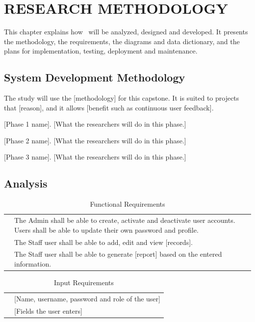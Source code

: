 \chapter{RESEARCH METHODOLOGY}
This chapter explains how \SystemName\ will be analyzed, designed and developed. It presents the methodology, the requirements, the diagrams and data dictionary, and the plans for implementation, testing, deployment and maintenance.

\section{System Development Methodology}
The study will use the [methodology] for this capstone. It is suited to projects that [reason], and it allows [benefit such as continuous user feedback].


[Phase 1 name]. [What the researchers will do in this phase.]

[Phase 2 name]. [What the researchers will do in this phase.]

[Phase 3 name]. [What the researchers will do in this phase.]

\section{Analysis}

\begin{table}[H]\caption{Functional Requirements}\centering
\begin{tabularx}{\textwidth}{|>{\raggedright\arraybackslash}p{1.75in}|Y|}\hline
{} & \\  & The Admin shall be able to create, activate and deactivate user accounts. Users shall be able to update their own password and profile.\\  & The Staff user shall be able to add, edit and view [records].\\ \hline
[Module 3] & The Staff user shall be able to generate [report] based on the entered information.\\ \hline
\end{tabularx}\end{table}

\begin{table}[H]\caption{Input Requirements}\centering
\begin{tabularx}{\textwidth}{|>{\raggedright\arraybackslash}p{1.75in}|Y|}\hline
{} & \\  & [Name, username, password and role of the user]\\ \hline
[Record 2] & [Fields the user enters]\\ \hline
\end{tabularx}\end{table}

